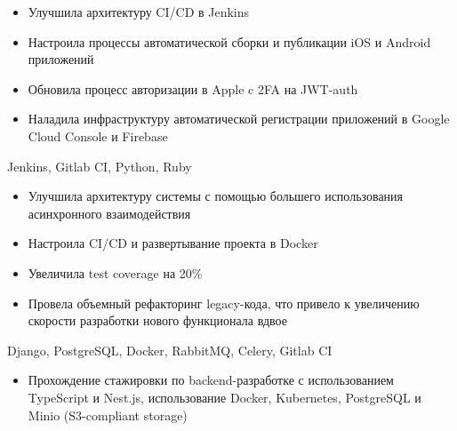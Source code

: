 \documentclass[10pt,a4paper,ragged2e,withhyper]{altacv}
\begin{document}
\begin{paracol}{2}


\begin{itemize}
\item Улучшила архитектуру CI/CD в Jenkins
\item Настроила процессы автоматической сборки и публикации iOS и Android приложений
\item Обновила процесс авторизации в Apple c 2FA на JWT-auth
\item Наладила инфраструктуру автоматической регистрации приложений в Google Cloud Console и Firebase
\end{itemize}
Jenkins, Gitlab CI, Python, Ruby
\divider


\begin{itemize}
\item Улучшила архитектуру системы с помощью большего использования асинхронного взаимодействия
\item Настроила CI/CD и развертывание проекта в Docker
\item Увеличила test coverage на 20\%
\item Провела объемный рефакторинг legacy-кода, что привело к увеличению скорости разработки нового функционала вдвое
\end{itemize}
Django, PostgreSQL, Docker, RabbitMQ, Celery, Gitlab CI

\divider


\begin{itemize}
    \item Прохождение стажировки по backend-разработке с использованием TypeScript и Nest.js, использование Docker, Kubernetes, PostgreSQL и Minio (S3-compliant storage)
\end{itemize}

\switchcolumn




\end{paracol}
\end{document}
